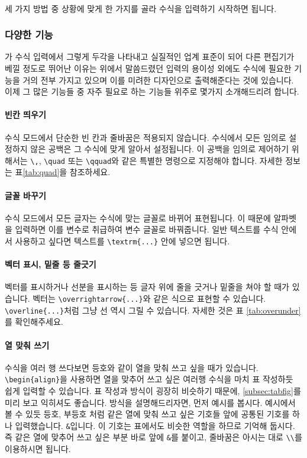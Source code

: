 \paragraph{}
세 가지 방법 중 상황에 맞게 한 가지를 골라 수식을 입력하기 시작하면 됩니다.

\subsubsection{다양한 기능}
\label{subsec:ams-func}
\lt 가 수식 입력에서 그렇게 두각을 나타내고 실질적인 업계 표준이 되어 다른 편집기가 베낄 정도로 뛰어난 이유는 위에서 말씀드렸던 입력의 용이성 외에도 수식에 필요한 기능을 거의 전부 가지고 있으며 이를 미려한 디자인으로 출력해준다는 것에 있습니다.
이제 그 많은 기능들 중 자주 필요로 하는 기능들 위주로 몇가지 소개해드리려 합니다.

\paragraph{빈칸 띄우기}
수식 모드에서 단순한 빈 칸과 줄바꿈은 적용되지 않습니다.
수식에서 모든 임의로 설정하지 않은 공백은 그 수식에 맞게 알아서 설정됩니다.
이 공백을 임의로 제어하기 위해서는  \verb|\,|, \verb|\quad| 또는 \verb|\qquad|와 같은 특별한 명령으로 지정해야 합니다.
자세한 정보는 표\ref{tab:quad}을 참조하세요.

\paragraph{글꼴 바꾸기}
수식 모드에서 모든 글자는 수식에 맞는 글꼴로 바뀌어 표현됩니다.
이 때문에 알파벳을 입력하면 이를 변수로 취급하여 변수 글꼴로 바꿔줍니다.
일반 텍스트를 수식 안에서 사용하고 싶다면 텍스트를 \verb|\textrm{...}| 안에 넣으면 됩니다.

\paragraph{벡터 표시, 밑줄 등 줄긋기}
벡터를 표시하거나 선분을 표시하는 등 글자 위에 줄을 긋거나 밑줄을 쳐야 할 때가 있습니다.
벡터는 \verb|\overrightarrow{...}|와 같은 식으로 표현할 수 있습니다.
\verb|\overline{...}|처럼 그냥 선 역시 그릴 수 있습니다.
자세한 것은 표 \ref{tab:overunder}를 확인해주세요.

\paragraph{열 맞춰 쓰기}
수식을 여러 행 쓰다보면 등호와 같이 열을 맞춰 쓰고 싶을 때가 있습니다.
\verb|\begin{align}|을 사용하면 열을 맞추어 쓰고 싶은 여러행 수식을 마치 표 작성하듯 쉽게 입력할 수 있습니다.
표 작성과 방식이 굉장히 비슷하기 때문에, \ref{subsec:tabfig}를 미리 보고 익히셔도 좋습니다.
방식을 설명해드리자면, 먼저 예시를 봅시다.
예시에서 볼 수 있듯 등호, 부등호 처럼 같은 열에 맞춰 쓰고 싶은 기호들 앞에 공통된 기호를 하나 입력했습니다.
\verb|&|입니다. 이 기호는 표에서도 비슷한 역할을 하므로 기억해 둡시다.
즉 같은 열에 맞추어 쓰고 싶은 부분 바로 앞에 \verb|&|를 붙이고, 줄바꿈은 아시는 대로 \verb|\\|를 이용하시면 됩니다.

